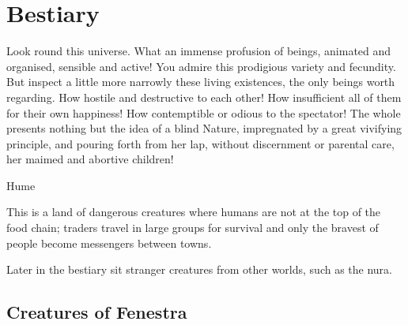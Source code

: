 \chapter{Bestiary}

\epigraph{Look round this universe. What an immense profusion of beings, animated and organised, sensible and active! You admire this prodigious variety and fecundity. But inspect a little more narrowly these living existences, the only beings worth regarding. How hostile and destructive to each other! How insufficient all of them for their own happiness! How contemptible or odious to the spectator! The whole presents nothing but the idea of a blind Nature, impregnated by a great vivifying principle, and pouring forth from her lap, without discernment or parental care, her maimed and abortive children!}{Hume}


\begin{multicols}{2}

\noindent
This is a land of dangerous creatures where humans are not at the top of the food chain; traders travel in large groups for survival and only the bravest of people become messengers between towns.

Later in the bestiary sit stranger creatures from other worlds, such as the nura.

\end{multicols}

\section{Creatures of Fenestra}

